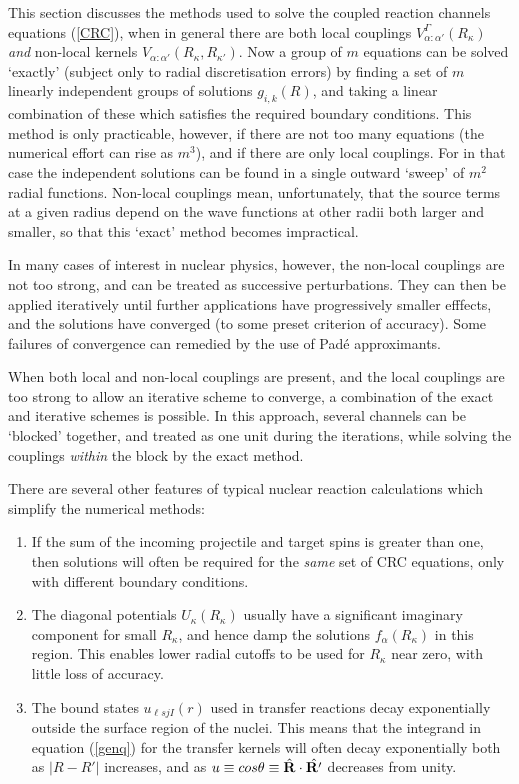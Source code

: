 \documentclass[11pt,a4paper]{article}
\newcommand{\vecR}{{\bf R}}
\begin{document}
This section discusses the methods used to solve the coupled reaction
channels equations (\ref{CRC}), when in general there are both  local
couplings $ V_{\alpha :\alpha'}^\Gamma (R_\kappa)$
{\em and} non-local kernels
$ V_{\alpha :\alpha'} (R_\kappa , R_{\kappa'} )$.
Now a group of $m$ equations can be solved `exactly' (subject only
to radial discretisation errors) by finding \cite{BSH}
a set of $m$ linearly independent groups of solutions
$ g_{i,k} (R) $, and taking a linear combination of these which satisfies
the required boundary conditions.
This method is only practicable, however, if there are not too many
equations (the numerical effort can rise as $m^3$), and if there
are only local couplings. For in that case the independent solutions can
be found in a single outward `sweep' of $m^2$ radial
functions. Non-local couplings mean, unfortunately, that the source terms
at a given radius depend on the wave functions at other radii both larger
and smaller, so that this `exact' method becomes impractical.

In many cases of interest in nuclear physics, however, the non-local
couplings are not too strong, and can be treated as successive
perturbations. They can then be applied iteratively until further
applications have progressively smaller efffects, and the solutions have
converged (to some preset criterion of accuracy).
Some failures of convergence can remedied by the use of Pad\'e
approximants.

When both local and non-local couplings are present, and the local
couplings are too strong to allow an iterative scheme to converge, a
combination of the exact and iterative schemes is possible.
In this approach, several channels can be `blocked' together, and
treated as one unit during the iterations, while solving the couplings
{\em within} the block by the exact method.

There are several other features of typical nuclear reaction calculations
which simplify the numerical methods:
\begin{enumerate}
\item If the sum of the incoming projectile and target spins is greater than
one, then solutions will often be required for the {\em same} set of
CRC equations, only with different boundary conditions.
\item The diagonal potentials $U_\kappa (R_\kappa )$ usually have
a significant imaginary component for small $ R_\kappa $, and
hence damp the solutions  $f_\alpha (R_\kappa )$
in this region. This enables lower radial cutoffs to be used for
$ R_\kappa $ near zero, with little loss of accuracy.
\item
The bound states $u_{\ell sjI} (r) $ used in transfer
reactions decay exponentially outside the surface region of the nuclei.
This means that the integrand in equation (\ref{genq}) for the transfer kernels
will often decay exponentially both as
$| R  - R' | $ increases, and as
$ u \equiv cos \theta \equiv \hat {\vecR } \cdot \hat {\vecR'}$
decreases from unity.
\end{enumerate}
\end{document}
